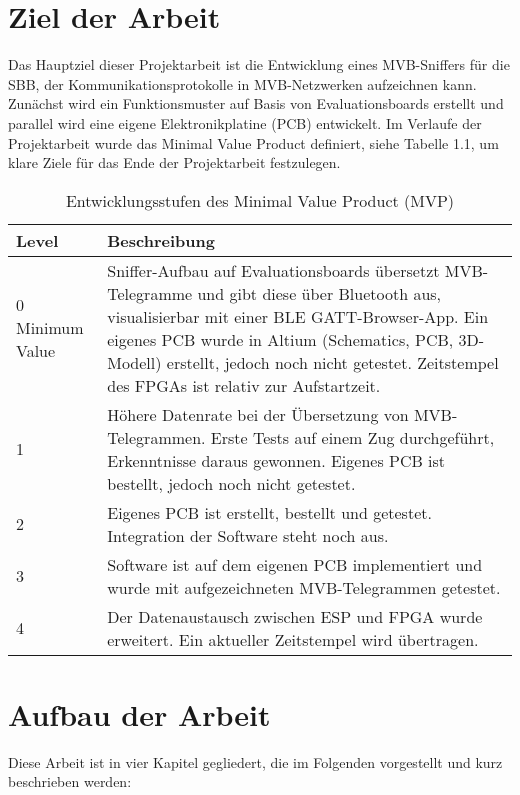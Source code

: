 \section{Ziel der Arbeit}
\label{Ziel der Arbeit} %

Das Hauptziel dieser Projektarbeit ist die Entwicklung eines MVB-Sniffers für die SBB, der Kommunikationsprotokolle in MVB-Netzwerken aufzeichnen kann. Zunächst wird ein Funktionsmuster auf Basis von Evaluationsboards erstellt und parallel wird eine eigene Elektronikplatine (PCB) entwickelt. Im Verlaufe der Projektarbeit wurde das Minimal Value Product definiert, siehe Tabelle 1.1, um klare Ziele für das Ende der Projektarbeit festzulegen.
\begin{table}[H]
\centering
\begin{tabular}{|p{1cm}|p{12cm}|}
\hline
\textbf{Level} & \textbf{Beschreibung} \\ \hline
0 Minimum Value & 
Sniffer-Aufbau auf Evaluationsboards übersetzt MVB-Telegramme und gibt diese über Bluetooth aus, visualisierbar mit einer BLE GATT-Browser-App. Ein eigenes PCB wurde in Altium (Schematics, PCB, 3D-Modell) erstellt, jedoch noch nicht getestet. Zeitstempel des FPGAs ist relativ zur Aufstartzeit. \\ \hline
1 & 
Höhere Datenrate bei der Übersetzung von MVB-Telegrammen. Erste Tests auf einem Zug durchgeführt, Erkenntnisse daraus gewonnen. Eigenes PCB ist bestellt, jedoch noch nicht getestet. \\ \hline
2 & 
Eigenes PCB ist erstellt, bestellt und getestet. Integration der Software steht noch aus. \\ \hline
3 & 
Software ist auf dem eigenen PCB implementiert und wurde mit aufgezeichneten MVB-Telegrammen getestet. \\ \hline
4 & 
Der Datenaustausch zwischen ESP und FPGA wurde erweitert. Ein aktueller Zeitstempel wird übertragen. \\ \hline
\end{tabular}
\caption{Entwicklungsstufen des Minimal Value Product (MVP)}
\label{tab:mvp_levels}
\end{table}


\section{Aufbau der Arbeit}
\label{Aufbau der Arbeit} %
Diese Arbeit ist in vier Kapitel gegliedert, die im Folgenden vorgestellt und kurz beschrieben werden:

